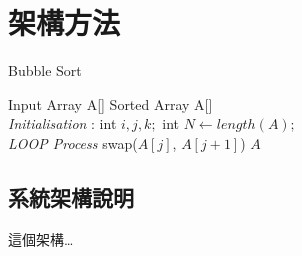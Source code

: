 \chapter{架構方法}
\label{chapter:processing}

\begin{algorithm}
    \caption{Bubble Sort}
    \begin{algorithmic}
        \renewcommand{\algorithmicrequire}{\textbf{Input:}}
        \renewcommand{\algorithmicensure}{\textbf{Output:}}
        \REQUIRE Input Array A[]
        \ENSURE  Sorted Array A[]
        \\ \textit{Initialisation} :
        \STATE int $i,j,k;$
        \STATE int $N \gets length(A);$
        \\ \textit{LOOP Process}
                    \STATE swap($A[j]$, $A[j+1]$)
                \ENDIF
            \ENDFOR
        \ENDFOR
        \RETURN $A$ 
    \end{algorithmic} 
    \label{alg:alg1}
\end{algorithm}

\section{系統架構說明}
\label{sec:processing}

這個架構\ldots
   
